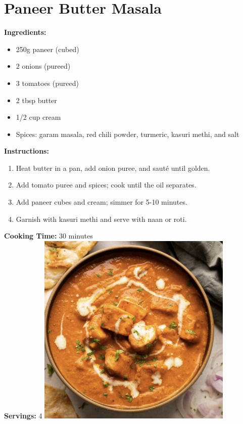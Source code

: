 \documentclass[12pt]{article}
\begin{document}
\section{Paneer Butter Masala}
\label{sec:paneer_butter_masala}
\textbf{Ingredients:}
\begin{itemize}
    \item 250g paneer (cubed)
    \item 2 onions (pureed)
    \item 3 tomatoes (pureed)
    \item 2 tbsp butter
    \item 1/2 cup cream
    \item Spices: garam masala, red chili powder, turmeric, kasuri methi, and salt
\end{itemize}

\textbf{Instructions:}
\begin{enumerate}
    \item Heat butter in a pan, add onion puree, and sauté until golden.
    \item Add tomato puree and spices; cook until the oil separates.
    \item Add paneer cubes and cream; simmer for 5-10 minutes.
    \item Garnish with kasuri methi and serve with naan or roti.
\end{enumerate}

\textbf{Cooking Time:} 30 minutes \\
\textbf{Servings:} 4
\includegraphics[width=0.7\textwidth]{paneer_butter_masala.png} 
\newpage

\end{document}
